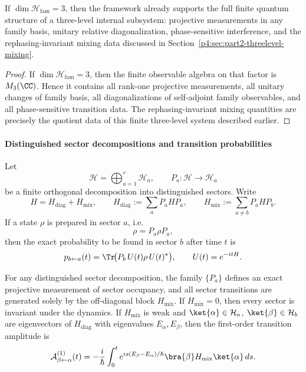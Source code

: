 \documentclass[12pt,a4paper]{article}
\begin{document}
\begin{corollary}
\label{p4:cor:rank-three-family-sectors}
If $\dim \mathcal H_{\mathrm{fam}}=3$, then the framework already supports the full finite quantum structure of a three-level internal subsystem:
projective measurements in any family basis, unitary relative diagonalization, phase-sensitive interference, and the rephasing-invariant mixing data discussed in Section~\ref{p4:sec:part2-threelevel-mixing}.
\end{corollary}

\begin{proof}
If \(\dim\mathcal H_{\mathrm{fam}}=3\), then the finite observable algebra on that factor is \(M_3(\CC)\).  Hence it contains all rank-one projective measurements, all unitary changes of family basis, all diagonalizations of self-adjoint family observables, and all phase-sensitive transition data.  The rephasing-invariant mixing quantities are precisely the quotient data of this finite three-level system described earlier.
\end{proof}




\paragraph{Distinguished sector decompositions and transition probabilities}
\label{p4:sec:part2-sector-transitions}

Let
\[
\mathcal H=\bigoplus_{a=1}^r \mathcal H_a,
\qquad
P_a:\mathcal H\to\mathcal H_a
\]
be a finite orthogonal decomposition into distinguished sectors.
Write
\[
H = H_{\mathrm{diag}} + H_{\mathrm{mix}},
\qquad
H_{\mathrm{diag}}:=\sum_a P_a H P_a,
\qquad
H_{\mathrm{mix}}:=\sum_{a\neq b} P_a H P_b.
\]
If a state \(\rho\) is prepared in sector \(a\), i.e.
\[
\rho=P_a\rho P_a,
\]
then the exact probability to be found in sector \(b\) after time \(t\) is
\begin{equation}
\label{p4:eq:sector-transition-prob}
p_{b\leftarrow a}(t)
=
\Tr\!\bigl(P_b\,U(t)\rho\,U(t)^*\bigr),
\qquad
U(t)=e^{-itH}.
\end{equation}

\begin{proposition}
\label{p4:prop:finite-sector-transition}
For any distinguished sector decomposition, the family
\(\{P_a\}\) defines an exact projective measurement of sector occupancy, and
all sector transitions are generated solely by the off-diagonal block
\(H_{\mathrm{mix}}\).
If \(H_{\mathrm{mix}}=0\), then every sector is invariant under the dynamics.
If \(H_{\mathrm{mix}}\) is weak and \(\ket{\alpha}\in\mathcal H_a\),
\(\ket{\beta}\in\mathcal H_b\) are eigenvectors of \(H_{\mathrm{diag}}\)
with eigenvalues \(E_\alpha,E_\beta\), then the first-order transition amplitude is
\begin{equation}
\label{p4:eq:sector-transition-amplitude}
\mathcal A^{(1)}_{\beta\leftarrow\alpha}(t)
=
-\frac{i}{\hbar}\int_0^t e^{is(E_\beta-E_\alpha)/\hbar}
\bra{\beta}H_{\mathrm{mix}}\ket{\alpha}\,ds.
\end{equation}
\end{proposition}
\end{document}
